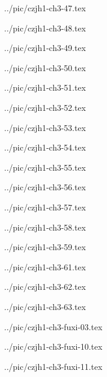 ../pic/czjh1-ch3-47.tex



../pic/czjh1-ch3-48.tex



../pic/czjh1-ch3-49.tex



../pic/czjh1-ch3-50.tex



../pic/czjh1-ch3-51.tex



../pic/czjh1-ch3-52.tex



../pic/czjh1-ch3-53.tex



../pic/czjh1-ch3-54.tex



../pic/czjh1-ch3-55.tex



../pic/czjh1-ch3-56.tex



../pic/czjh1-ch3-57.tex



../pic/czjh1-ch3-58.tex



../pic/czjh1-ch3-59.tex



../pic/czjh1-ch3-61.tex



../pic/czjh1-ch3-62.tex



../pic/czjh1-ch3-63.tex



../pic/czjh1-ch3-fuxi-03.tex



../pic/czjh1-ch3-fuxi-10.tex



../pic/czjh1-ch3-fuxi-11.tex



